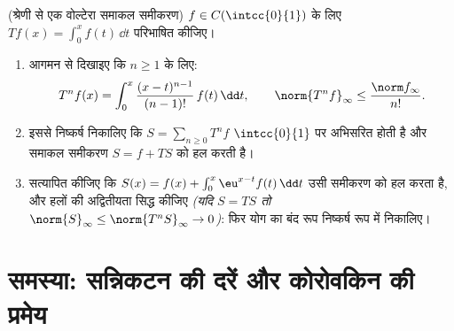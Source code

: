\begin{exercise}[$\star\star\star$]\label{exo:b2:funcseq:12}
(श्रेणी से एक वोल्टेरा समाकल समीकरण) $f \in
C(\intcc{0}{1})$ के लिए $Tf(x) = \int_0^x f(t)\,\dd t$ परिभाषित कीजिए।
\begin{enumerate}
  \item आगमन से दिखाइए कि $n \geq 1$ के लिए:
        \[
        T^n f(x) = \int_0^x \frac{(x -
        t)^{n-1}}{(n-1)!}\,f(t)\,\dd t,
        \qquad
        \norm{T^n f}_\infty \leq \frac{\norm f_\infty}{n!} .
        \]
  \item इससे निष्कर्ष निकालिए कि $S = \sum_{n\geq0} T^n f$ $\intcc{0}{1}$ पर  अभिसरित होती
        है और समाकल समीकरण $S = f
        + TS$ को हल करती है।
  \item सत्यापित कीजिए कि $S(x) = f(x) + \int_0^x \eu^{x-t}f(t)\,\dd
        t$ उसी समीकरण को हल करता है, और  हलों की
        अद्वितीयता सिद्ध कीजिए \emph{(यदि $S = TS$ तो $\norm{S}_\infty \leq \norm{T^nS}_\infty \to 0$)}: फिर योग का बंद
        रूप निष्कर्ष रूप में निकालिए।
\end{enumerate}
\end{exercise}

\section{समस्या: सन्निकटन की दरें और कोरोवकिन की प्रमेय}

